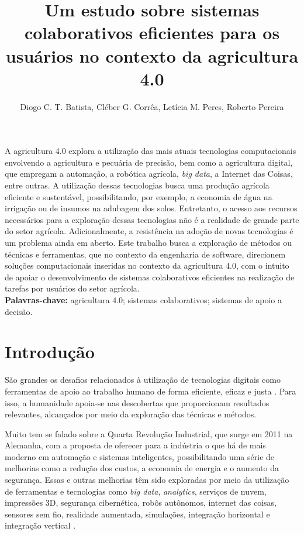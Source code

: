 \documentclass[12pt]{article}
\title{Um estudo sobre sistemas colaborativos eficientes para os usuários no contexto da agricultura 4.0}
\author{Diogo C. T. Batista\inst{1}, Cléber G. Corrêa\inst{1}, Letícia M. Peres\inst{2}, Roberto Pereira\inst{2}}
\begin{document}
 

\maketitle
     
\begin{resumo} 
A agricultura 4.0 explora a utilização das mais atuais tecnologias computacionais envolvendo a agricultura e pecuária de precisão, bem como a agricultura digital, que empregam a automação, a robótica agrícola, \textit{big data}, a Internet das Coisas, entre outras. A utilização dessas tecnologias busca uma produção agrícola eficiente e sustentável, possibilitando, por exemplo, a economia de água na irrigação ou de insumos na adubagem dos solos. Entretanto, o acesso aos recursos necessários para a exploração dessas tecnologias não é a realidade de grande parte do setor agrícola. Adicionalmente, a resistência na adoção de novas tecnologias é um problema ainda em aberto. Este trabalho busca a exploração de métodos ou técnicas e ferramentas, que no contexto da engenharia de software, direcionem soluções computacionais inseridas no contexto da agricultura 4.0, com o intuito de apoiar o desenvolvimento de sistemas colaborativos eficientes na realização de tarefas por usuários do setor agrícola.\\

\textbf{Palavras-chave:} agricultura 4.0; sistemas colaborativos; sistemas de apoio a decisão.
\end{resumo}

\section{Introdução}
\label{sec:introducao}

São grandes os desafios relacionados à utilização de tecnologias digitais como ferramentas de apoio ao trabalho humano de forma eficiente, eficaz e justa \cite{Rose:2019}. Para isso, a humanidade apoia-se nas descobertas que proporcionam resultados relevantes, alcançados por meio da exploração das técnicas e métodos.

Muito tem se falado sobre a Quarta Revolução Industrial, que surge em 2011 na Alemanha, com a proposta de oferecer para a indústria o que há de mais moderno em automação e sistemas inteligentes, possibilitando uma série de melhorias como a redução dos custos, a economia de energia e o aumento da segurança. Essas e outras melhorias têm sido exploradas por meio da utilização de ferramentas e tecnologias como \textit{big data}, \textit{analytics}, serviços de nuvem, impressões 3D, segurança cibernética, robôs autônomos, internet das coisas, sensores sem fio, realidade aumentada, simulações, integração horizontal e integração vertical \cite{Souza:2017}.
\end{document}
